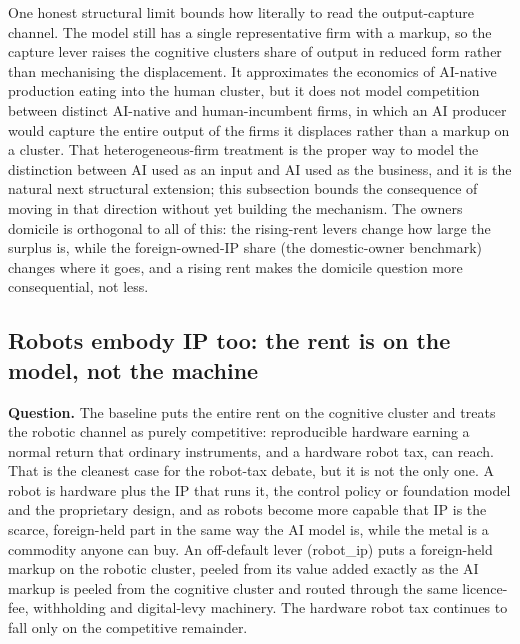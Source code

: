\documentclass[11pt]{article}
\begin{document}
One honest structural limit bounds how literally to read the
output-capture channel. The model still has a single representative firm
with a markup, so the capture lever raises the cognitive
cluster\textquotesingle s share of output in reduced form rather than
mechanising the displacement. It approximates the economics of AI-native
production eating into the human cluster, but it does not model
competition between distinct AI-native and human-incumbent firms, in
which an AI producer would capture the entire output of the firms it
displaces rather than a markup on a cluster. That heterogeneous-firm
treatment is the proper way to model the distinction between AI used as
an input and AI used as the business, and it is the natural next
structural extension; this subsection bounds the consequence of moving
in that direction without yet building the mechanism. The
owner\textquotesingle s domicile is orthogonal to all of this: the
rising-rent levers change how large the surplus is, while the
foreign-owned-IP share (the domestic-owner benchmark) changes where it
goes, and a rising rent makes the domicile question more consequential,
not less.

\hypertarget{robots-embody-ip-too-the-rent-is-on-the-model-not-the-machine}{%
\subsection{Robots embody IP too: the rent is on the model, not the
machine}\label{robots-embody-ip-too-the-rent-is-on-the-model-not-the-machine}}

\textbf{Question.} The baseline puts the entire rent on the cognitive
cluster and treats the robotic channel as purely competitive:
reproducible hardware earning a normal return that ordinary instruments,
and a hardware robot tax, can reach. That is the cleanest case for the
robot-tax debate, but it is not the only one. A robot is hardware plus
the IP that runs it, the control policy or foundation model and the
proprietary design, and as robots become more capable that IP is the
scarce, foreign-held part in the same way the AI model is, while the
metal is a commodity anyone can buy. An off-default lever (robot\_ip)
puts a foreign-held markup on the robotic cluster, peeled from its value
added exactly as the AI markup is peeled from the cognitive cluster and
routed through the same licence-fee, withholding and digital-levy
machinery. The hardware robot tax continues to fall only on the
competitive remainder.
\end{document}
